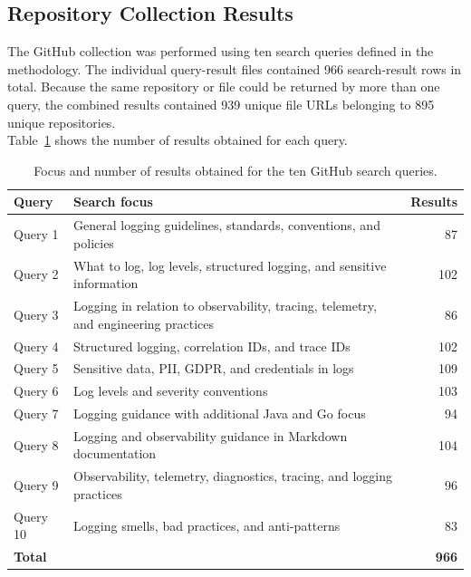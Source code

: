 \subsection{Repository Collection Results}

The GitHub collection was performed using ten search queries defined in the
methodology. The individual query-result files contained 966 search-result rows in
total. Because the same repository or file could be returned by more than one query,
the combined results contained 939 unique file URLs belonging to 895 unique
repositories.
\\
Table~\ref{tab:github-query-results} shows the number of results obtained for each
query.

\begin{table}[H]
    \centering
    \small

    \begin{tabularx}{\textwidth}{l X r}
        \toprule
        \textbf{Query} & \textbf{Search focus} & \textbf{Results} \\
        \midrule
        Query 1 & General logging guidelines, standards, conventions, and policies & 87 \\
        Query 2 & What to log, log levels, structured logging, and sensitive information & 102 \\
        Query 3 & Logging in relation to observability, tracing, telemetry, and engineering practices & 86 \\
        Query 4 & Structured logging, correlation IDs, and trace IDs & 102 \\
        Query 5 & Sensitive data, PII, GDPR, and credentials in logs & 109 \\
        Query 6 & Log levels and severity conventions & 103 \\
        Query 7 & Logging guidance with additional Java and Go focus & 94 \\
        Query 8 & Logging and observability guidance in Markdown documentation & 104 \\
        Query 9 & Observability, telemetry, diagnostics, tracing, and logging practices & 96 \\
        Query 10 & Logging smells, bad practices, and anti-patterns & 83 \\
        \midrule
        \textbf{Total} & & \textbf{966} \\
        \bottomrule
    \end{tabularx}

    \caption{Focus and number of results obtained for the ten GitHub search queries.}
    \label{tab:github-query-results}
\end{table}

